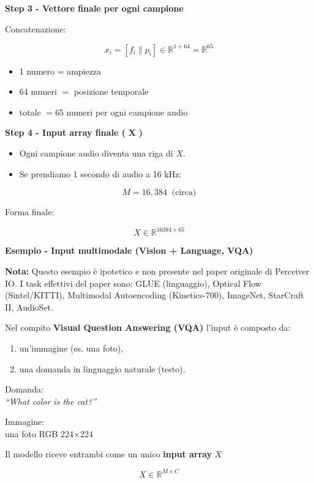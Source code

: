 \documentclass[
  11pt,
]{article}
\begin{document}
\textbf{Step 3 - Vettore finale per ogni campione}

Concatenazione:

\[x_{i} = \left\lbrack f_{i}\| p_{i} \right\rbrack \in \mathbb{R}^{1 + 64} = \mathbb{R}^{65}\]

\begin{itemize}
\item
  1 numero = ampiezza
\item
  64 numeri \(=\) posizione temporale
\item
  totale \(= 65\) numeri per ogni campione audio
\end{itemize}

\textbf{Step 4 - Input array finale (} \(\mathbf{X}\) \textbf{)}

\begin{itemize}
\item
  Ogni campione audio diventa una riga di \(X\).
\item
  Se prendiamo 1 secondo di audio a 16 kHz:
\end{itemize}

\[M = 16,384\ \text{ (circa)}\]

Forma finale:

\[X \in \mathbb{R}^{16384 \times 65}\]

\textbf{Esempio - Input multimodale (Vision + Language, VQA)}

\textbf{Nota:} Questo esempio è ipotetico e non presente nel paper originale di Perceiver IO. I task effettivi del paper sono: GLUE (linguaggio), Optical Flow (Sintel/KITTI), Multimodal Autoencoding (Kinetics-700), ImageNet, StarCraft II, AudioSet.

Nel compito \textbf{Visual Question Answering (VQA)} l'input è composto
da:

\begin{enumerate}
\def\labelenumi{\arabic{enumi}.}
\item
  un'immagine (es. una foto),
\item
  una domanda in linguaggio naturale (testo).
\end{enumerate}

Domanda:\\
 \emph{``What color is the cat?''}

Immagine:\\
 una foto RGB 224×224

Il modello riceve entrambi come un unico \textbf{input array} \(X\)

\[X \in \mathbb{R}^{M \times C}\]
\end{document}
